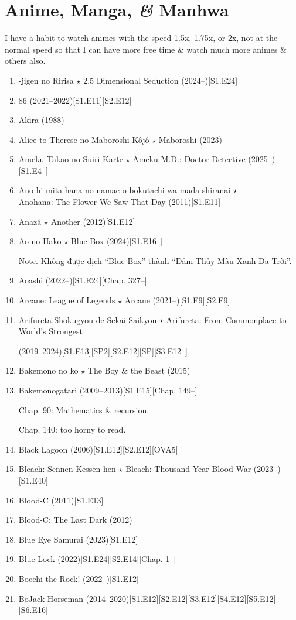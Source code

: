 \documentclass{article}
\begin{document}
\section{Anime, Manga, {\it\&} Manhwa}
I have a habit to watch animes with the speed 1.5x, 1.75x, or 2x, not at the normal speed so that I can have more free time \& watch much more animes \& others also.
\begin{enumerate}
	\item {-jigen no Ririsa $\star$ 2.5 Dimensional Seduction} (2024--)\hfill[S1.E24]
	\item 86 (2021--2022)\hfill[S1.E11][S2.E12]
    \item {\sc Akira} (1988)
    \item {\sc Alice to Therese no Maboroshi Kôjô $\star$ Maboroshi} (2023)
    \item Ameku Takao no Suiri Karte $\star$ Ameku M.D.: Doctor Detective (2025--)\hfill[S1.E4--]
    \item {\sc Ano hi mita hana no namae o bokutachi wa mada shiranai $\star$\\Anohana: The Flower We Saw That Day} (2011)\hfill[S1.E11]
    \item {\sc Anazâ $\star$ Another} (2012)\hfill[S1.E12]
    \item Ao no Hako $\star$ Blue Box (2024)\hfill[S1.E16--]
    
    {\sf Note.} Không được dịch ``Blue Box'' thành ``Dâm Thủy Màu Xanh Da Trời''.
    \item Aoashi (2022--)\hfill[S1.E24][Chap. 327--]
        
    \item {\sc Arcane: League of Legends $\star$ Arcane} (2021--)\hfill[S1.E9][S2.E9]
    \item  Arifureta Shokugyou de Sekai Saikyou $\star$ Arifureta: From Commonplace to World's Strongest
    
    (2019--2024)\hfill[S1.E13][SP2][S2.E12][SP][S3.E12--]
    \item {\sc Bakemono no ko $\star$ The Boy \& the Beast} (2015)
    \item {\sc Bakemonogatari} (2009--2013)\hfill[S1.E15][Chap. 149--]
    
    Chap. 90: Mathematics \& recursion.
    
    Chap. 140: too horny to read.
    \item {\sc Black Lagoon} (2006)\hfill[S1.E12][S2.E12][OVA5]
    \item {\sc Bleach: Sennen Kessen-hen $\star$ Bleach: Thousand-Year Blood War} (2023--)\hfill[S1.E40]
    \item {\sc Blood-C} (2011)\hfill[S1.E13]
    \item Blood-C: The Last Dark (2012)
    \item {\sc Blue Eye Samurai} (2023)\hfill[S1.E12]
    \item {\sc Blue Lock} (2022)\hfill[S1.E24][S2.E14][Chap. 1--]
    \item Bocchi the Rock! (2022--)\hfill[S1.E12]
    \item {\sc BoJack Horseman} (2014--2020)\hfill[S1.E12][S2.E12][S3.E12][S4.E12][S5.E12][S6.E16]
    

\end{enumerate}
\end{document}
